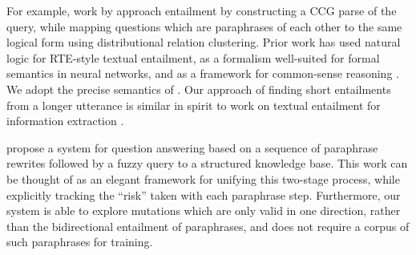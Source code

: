 For example, work by 
  approach entailment by constructing a CCG parse of the query,
  while mapping questions which are paraphrases of each other to the
  same logical form using distributional relation clustering.
Prior work has used natural logic
  for RTE-style textual entailment,
  as a formalism well-suited for formal semantics in neural networks,
  and as a framework for common-sense reasoning
  \cite{key:2009maccartney-natlog,key:2012watanabe-natlog,key:2014bowman-natlog,key:2014angeli-naturalli}.
We adopt the precise semantics of .
Our approach of finding short entailments from a longer utterance is similar
  in spirit to work on textual entailment for information extraction
  \cite{key:2006romano-ie}.




%
%
 propose a system for question answering
  based on a sequence of paraphrase rewrites followed by a fuzzy query to
  a structured knowledge base.
This work can be thought of as an elegant framework for unifying this
  two-stage process, while explicitly tracking the ``risk'' taken with
  each paraphrase step.
Furthermore, our system is able to explore mutations which are only
  valid in one direction, rather than the bidirectional entailment of
  paraphrases, and does not require a corpus of such paraphrases for
  training.


